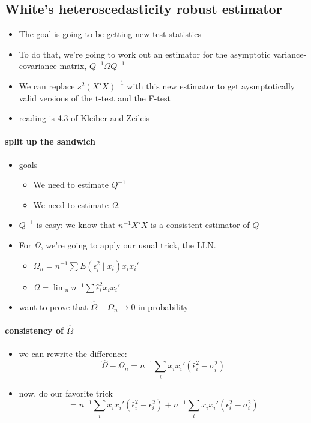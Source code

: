 \subsection{White's heteroscedasticity robust estimator}
\label{sec-1-2}

\begin{itemize}
\item The goal is going to be getting new test statistics
\item To do that, we're going to work out an estimator for the
       asymptotic variance-covariance matrix, $Q^{-1} \Omega Q^{-1}$
\item We can replace $s^2(X'X)^{-1}$ with this new estimator to get
       aysmptotically valid versions of the t-test and the F-test
\item reading is 4.3 of Kleiber and Zeileis
\end{itemize}
\paragraph{split up the sandwich}
\label{sec-1-2-1}

\begin{itemize}
\item goals
\begin{itemize}
\item We need to estimate $Q^{-1}$
\item We need to estimate $\Omega$.
\end{itemize}
\item $Q^{-1}$ is easy: we know that $n^{-1} X'X$ is a consistent
        estimator of $Q$
\item For $\Omega$, we're going to apply our usual trick, the LLN.
\begin{itemize}
\item $\Omega_n = n^{-1} \sum E(\epsilon_i^2 \mid x_i) x_i x_i'$
\item $\hat\Omega = \lim_n n^{-1} \sum \hat\epsilon_i^2 x_i x_i'$
\end{itemize}
\item want to prove that $\hat\Omega - \Omega_n \to 0$ in probability
\end{itemize}
\paragraph{consistency of $\hat\Omega$}
\label{sec-1-2-2}

\begin{itemize}
\item we can rewrite the difference:
        \[\hat\Omega - \Omega_n = n^{-1} \sum_i x_i x_i'
        (\hat\epsilon_i^2 - \sigma_i^2)\]
\item now, do our favorite trick
        \[= n^{-1} \sum_i x_i x_i'(\hat\epsilon_i^2 - \epsilon_i^2) + 
        n^{-1} \sum_i x_i x_i'(\epsilon_i^2 - \sigma_i^2)\]
\end{itemize}
